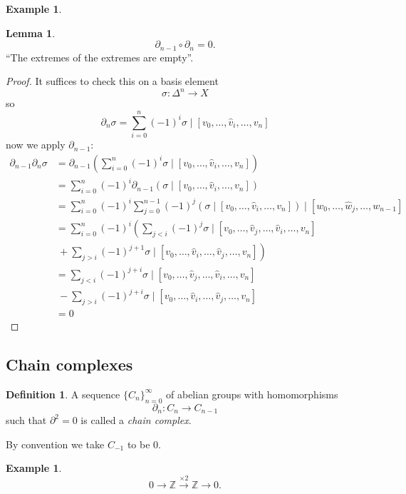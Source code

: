 \documentclass[12pt]{article}
\theoremstyle{definition}
\newtheorem{lem}[thm]{Lemma}
\theoremstyle{definition}
\newtheorem{defn}[thm]{Definition}
\newtheorem{ex}[thm]{Example}
\newcommand{\ZZ}{\mathbb{Z}}
\begin{document}
\begin{ex}
\end{ex}

\begin{lem}
\[\partial_{n-1} \circ \partial_n = 0.\]
``The extremes of the extremes are empty''.
\end{lem}
\begin{proof}
It suffices to check this on a basis element
\[\sigma \colon \Delta^n \to X\]
so
\[\partial_n \sigma = \sum_{i=0}^{n} (-1)^i \sigma \mid[v_0, \ldots, \hat{v}_i,\ldots,v_n]\]
now we apply $\partial_{n-1}$:
\begin{align*}
\partial_{n-1} \partial_n \sigma &= \partial_{n-1} \left(\sum_{i=0}^{n} (-1)^i \sigma \mid[v_0, \ldots, \hat{v}_i,\ldots,v_n] \right) \\
&= \sum_{i=0}^{n} (-1)^i \partial_{n-1} \left(\sigma \mid[v_0, \ldots, \hat{v}_i,\ldots,v_n]\right)\\
&= \sum_{i=0}^{n} (-1)^i \sum_{j= 0}^{n-1} (-1)^j\left(\sigma \mid[v_0, \ldots, \hat{v}_i,\ldots,v_n]\right)\mid[w_0, \ldots, \hat{w}_j,\ldots,w_{n-1}]\\
&= \sum_{i=0}^{n} (-1)^i\left( \sum_{j< i} (-1)^j \sigma \mid[v_0, \ldots,\hat{v}_j, \ldots, \hat{v}_i,\ldots,v_n] \right.\\
&\ +\left. \sum_{j> i} (-1)^{j+1} \sigma \mid[v_0, \ldots, \hat{v}_i,\ldots,\hat{v}_j,\ldots,v_n]\right) \\
&= \sum_{j< i} (-1)^{j+i} \sigma \mid[v_0, \ldots,\hat{v}_j, \ldots, \hat{v}_i,\ldots,v_n] \\
&\ - \sum_{j> i} (-1)^{j+i} \sigma \mid[v_0, \ldots, \hat{v}_i,\ldots,\hat{v}_j,\ldots,v_n] \\
&= 0
\end{align*}
\end{proof}

\subsection{Chain complexes}
\begin{defn}
A sequence $\{C_n\}_{n=0}^{\infty}$ of abelian groups with homomorphisms
\[
\partial_n\colon C_n\to C_{n-1}
\]
such that $\partial^2 = 0$ is called a \emph{chain complex}.
\end{defn}

By convention we take $C_{-1}$ to be 0.

\begin{ex}
\[0\to\ZZ\xrightarrow{\times 2} \ZZ \to 0.\]
\end{ex}
\end{document}
